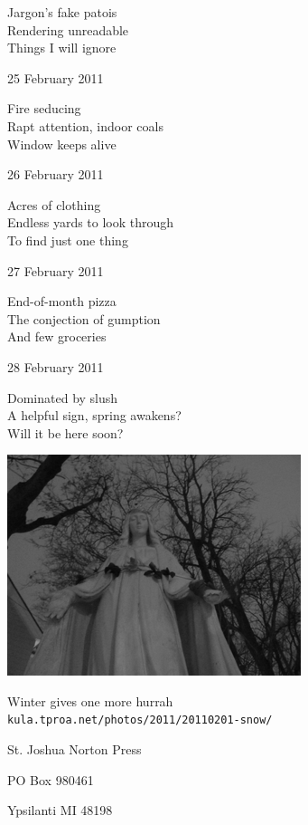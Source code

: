\documentclass[12pt]{article}
\begin{document}
Jargon's fake patois \\
Rendering unreadable \\
Things I will ignore

25 February 2011

Fire seducing \\
Rapt attention, indoor coals \\
Window keeps alive

26 February 2011

Acres of clothing \\
Endless yards to look through \\
To find just one thing

27 February 2011

End-of-month pizza \\
The conjection of gumption \\
And few groceries

28 February 2011

Dominated by slush \\
A helpful sign, spring awakens? \\
Will it be here soon?



\newpage

\begin{center}
\includegraphics{mary-snow.png}

Winter gives one more hurrah \\
{\tt kula.tproa.net/photos/2011/20110201-snow/ }
\end{center}



\newpage

\thispagestyle{empty}
\vspace*{12cm}
\begin{sideways}
\Large{St. Joshua Norton Press}
\end{sideways}
\begin{sideways}
\Large{PO Box 980461}
\end{sideways}
\begin{sideways}
\Large{Ypsilanti MI 48198}
\end{sideways}
\end{document}
